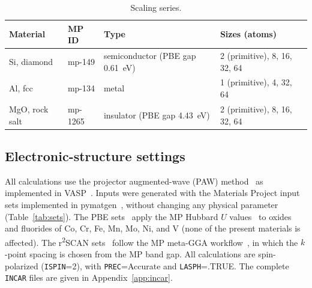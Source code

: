\documentclass[11pt,letterpaper]{article}
\begin{document}
\begin{table}[htbp]
\centering
\caption{Scaling series.}
\label{tab:structures}
\begin{tabular}{@{}llll@{}}
\toprule
Material & MP ID & Type & Sizes (atoms) \\
\midrule
Si, diamond & mp-149 & semiconductor (PBE gap \SI{0.61}{eV}) & 2 (primitive), 8, 16, 32, 64 \\
Al, fcc & mp-134 & metal & 1 (primitive), 4, 32, 64 \\
MgO, rock salt & mp-1265 & insulator (PBE gap \SI{4.43}{eV}) & 2 (primitive), 8, 16, 32, 64 \\
\bottomrule
\end{tabular}
\end{table}

\subsection{Electronic-structure settings}
\label{sec:settings}

All calculations use the projector augmented-wave (PAW) method~\cite{Blochl1994,Kresse1999} as
implemented in VASP~\cite{Kresse1996}. Inputs were generated with the Materials Project input
sets implemented in pymatgen~\cite{Ong2013}, without changing any physical parameter
(Table~\ref{tab:sets}). The PBE sets~\cite{Perdew1996} apply the MP Hubbard $U$
values~\cite{Dudarev1998} to oxides and fluorides of Co, Cr, Fe, Mn, Mo, Ni, and V (none of the
present materials is affected). The r\textsuperscript{2}SCAN sets~\cite{Furness2020} follow the
MP meta-GGA workflow~\cite{Kingsbury2022}, in which the $k$-point spacing is chosen from the MP
band gap. All calculations are spin-polarized (\texttt{ISPIN}=2), with \texttt{PREC}=Accurate
and \texttt{LASPH}=.TRUE. The complete \texttt{INCAR} files are given in Appendix~\ref{app:incar}.
\end{document}

